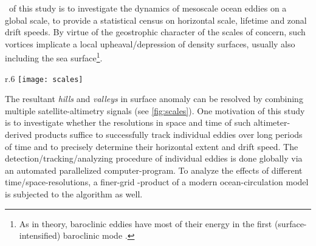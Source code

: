 ~of this study is to investigate the dynamics of mesoscale ocean eddies on a global scale, \ie to provide a statistical census on horizontal scale, lifetime and zonal drift speeds.
By virtue of the geostrophic character of the scales of concern, such vortices implicate a local upheaval/depression of density surfaces, usually also including the sea surface\footnote{As in theory, baroclinic eddies have most of their energy in the first (surface-intensified) baroclinic mode \citep{olbers2012ocean}.}.
\begin{wrapfigure}{r}{.6\textwidth}
\texttt{[image: scales]}
\caption{Resolutions for model vs satellite. Modified version from \citet{olbers2012ocean}.}
\label{fig:scales}
\end{wrapfigure}
The resultant \textit{hills} and \textit{valleys} in surface anomaly can be resolved by combining multiple satellite-altimetry signals (see \cref{fig:scales}). One motivation of this study is to investigate whether the resolutions in space and time of such altimeter-derived products suffice to successfully track individual eddies over long periods of time and to precisely determine their horizontal extent and drift speed. The detection/tracking/analyzing procedure of individual eddies is done globally via an automated parallelized computer-program. To analyze the effects of different time/space-resolutions, a finer-grid \SSH-product of a modern ocean-circulation model is subjected to the algorithm as well.
